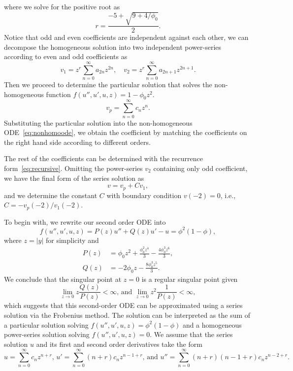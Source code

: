 where we solve for the positive root as
\begin{equation}
r = \frac{-5+\sqrt{9+4/\phi_0}}{2}.
\end{equation}
Notice that odd and even coefficients are independent against each other, we can decompose the 
homogeneous solution into two independent power-series according to even and odd coefficients as
\begin{equation}
v_1 = z^r \sum_{n=0}^{\infty} a_{2n} z^{2n}, \quad v_2 = z^r \sum_{n=0}^{\infty} a_{2n+1} z^{2n+1}.
\end{equation}
Then we proceed to determine the particular solution that solves the
non-homogeneous function $f(u'',u',u,z) = 1-\phi_0z^2$.
\begin{equation}
v_p = \sum_{n=0}^\infty c_n z^n.
\end{equation}
Substituting the particular solution into the non-homogeneous ODE~\eqref{eq:nonhomoode}, we obtain the coefficient 
by matching the coefficients on the right hand side according to different orders.

The rest of the coefficients can be determined with the recurrence form~\eqref{eq:recursive}.
Omitting the power-series $v_2$ containing only odd coefficient, we have the final form of
the series solution as
\begin{equation}
v = v_p + C v_1,
\end{equation}
and we determine the constant $C$ with boundary condition $v(-2) = 0$, i.e., $C = -v_p(-2)/v_1(-2)$.
\fi

To begin with, we rewrite our second order ODE into
\begin{equation}\label{eq:partODE}
		  f(u'',u',u,z) = P(z) u'' + Q(z) u' - u = \phi^2(1-\phi),
\end{equation}
where $z = \lvert y \rvert$ for simplicity and 
\begin{equation}
		  \begin{aligned}
					 P(z) &= \phi_0 z^2 + \frac{\phi_0^2 z^4}{3} - 
					 \frac{4\phi_0^3z^6}{3},\\
					 Q(z) &= -2\phi_0z - \frac{8\phi_0^3 z^5}{3}.
		  \end{aligned}
\end{equation}
We conclude that the singular point at $z=0$ is a regular singular point given
\begin{equation}
		  \lim_{z\rightarrow 0} z \frac{Q(z)}{P(z)} < \infty, \, \text{and} \,\,
\lim_{z\rightarrow 0} z^2 \frac{1}{P(z)} < \infty,
\end{equation}
which suggests that this second-order ODE can be approximated using a series
solution via the Frobenius method.
The solution can be interpreted as the sum of a particular
solution solving $f(u'',u',u,z) = \phi^2(1-\phi)$ and a homogeneous 
power-series solution solving $f(u'',u',u,z) = 0$. We assume that the series solution
$u$ and its first and second order derivatives take the form 
\begin{equation}\label{eq:seriessoln}
		  u = \sum_{n=0}^{\infty} c_n z^{n+r}, \, 
		  u' = \sum_{n=0}^{\infty} (n+r) c_n z^{n-1+r}, \, \text{and} \, \,
		  u'' = \sum_{n=0}^{\infty} (n+r)(n-1+r) c_n z^{n-2+r}.
\end{equation}

